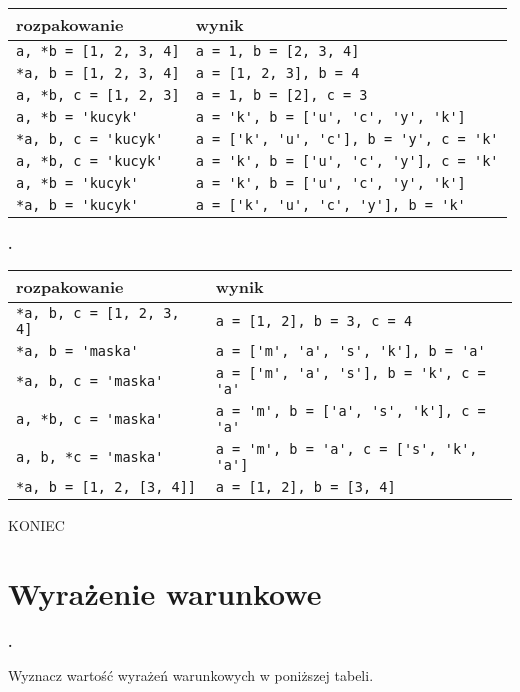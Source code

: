 \documentclass[a4paper]{article}
\begin{document}
\begin{tabular}{p{}|p{}}
\textsf{rozpakowanie} & \textsf{wynik} \\\hline
\verb|a, *b = [1, 2, 3, 4]| & \verb|a = 1, b = [2, 3, 4]| \\
\verb|*a, b = [1, 2, 3, 4]| & \verb|a = [1, 2, 3], b = 4| \\
\verb|a, *b, c = [1, 2, 3]| & \verb|a = 1, b = [2], c = 3| \\
\verb|a, *b = 'kucyk'| & \verb|a = 'k', b = ['u', 'c', 'y', 'k']| \\
\verb|*a, b, c = 'kucyk'| & \verb|a = ['k', 'u', 'c'], b = 'y', c = 'k'| \\
\verb|a, *b, c = 'kucyk'| & \verb|a = 'k', b = ['u', 'c', 'y'], c = 'k'| \\
\verb|a, *b = 'kucyk'| & \verb|a = 'k', b = ['u', 'c', 'y', 'k']|\\
\verb|*a, b = 'kucyk'| & \verb|a = ['k', 'u', 'c', 'y'], b = 'k'|\\
\end{tabular}

\textbf{.}\addtocounter{zadanie}{1}

\begin{tabular}{p{}|p{}}
\textsf{rozpakowanie} & \textsf{wynik} \\\hline
\verb|*a, b, c = [1, 2, 3, 4]| & \verb|a = [1, 2], b = 3, c = 4| \\
\verb|*a, b = 'maska'| & \verb|a = ['m', 'a', 's', 'k'], b = 'a'| \\
\verb|*a, b, c = 'maska'| & \verb|a = ['m', 'a', 's'], b = 'k', c = 'a'| \\
\verb|a, *b, c = 'maska'| & \verb|a = 'm', b = ['a', 's', 'k'], c = 'a'| \\
\verb|a, b, *c = 'maska'| & \verb|a = 'm', b = 'a', c = ['s', 'k', 'a']| \\
\verb|*a, b = [1, 2, [3, 4]]| & \verb|a = [1, 2], b = [3, 4]| \\
\end{tabular}

KONIEC
\section{Wyrażenie warunkowe}

\textbf{.}\addtocounter{zadanie}{1} Wyznacz wartość wyrażeń warunkowych w poniższej tabeli.
\end{document}
